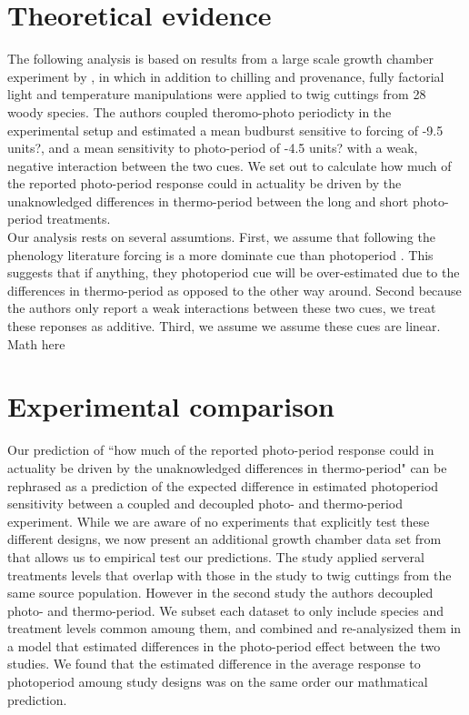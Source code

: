 \documentclass{article}[11pt]
\begin{document}
\section*{Theoretical evidence}   
\noindent The following analysis is based on results from a large scale growth chamber experiment by \citet{Flynn2018}, in which in addition to chilling and provenance, fully factorial light and temperature manipulations were applied to twig cuttings from 28 woody species. The authors coupled theromo-photo periodicty in the experimental setup and estimated a mean budburst sensitive to forcing of -9.5 units?, and  a mean sensitivity to photo-period of -4.5 units? with a weak, negative interaction between the two cues. We set out to calculate how much of the reported photo-period response could in actuality be driven by the unaknowledged differences in thermo-period between the long and short photo-period treatments. \\

\noident Our analysis rests on several assumtions. First, we assume that following the phenology literature forcing is a more dominate cue than photoperiod \citep{}. This suggests that if anything, they photoperiod cue will be over-estimated due to the differences in thermo-period as opposed to the other way around. Second because the authors only report a weak interactions between these two cues, we treat these reponses as additive. Third, we assume we assume these cues are linear.\\

Math here

\section*{Experimental comparison}
\indent\indent Our prediction of ``how much of the reported photo-period response could in actuality be driven by the unaknowledged differences in thermo-period" can be rephrased as a prediction of the expected difference in estimated photoperiod sensitivity between a coupled and decoupled photo- and thermo-period experiment. While we are aware of no experiments that explicitly test these different designs, we now present an additional growth chamber data set from  \citet{Buonaiuto2020} that allows us to empirical test our predictions. The \citet{Buonaiuto} study applied serveral treatments levels that overlap with those in the \citet{Flynn2018} study to twig cuttings from the same source population. However in the second study the authors decoupled photo- and thermo-period. We subset each dataset to only include species and treatment levels common amoung them, and combined and re-analysized them in a model that estimated differences in the photo-period effect between the two studies. We found that the estimated difference in the average response to photoperiod amoung study designs  was on the same order our mathmatical prediction.\\
\end{document}
